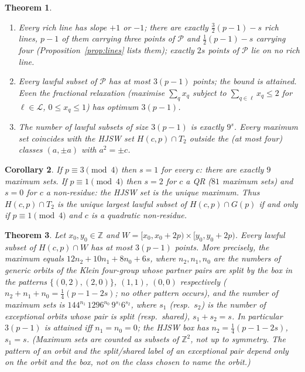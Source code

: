 \documentclass[11pt]{article}
\newtheorem{theorem}{Theorem}
\newtheorem{corollary}[theorem]{Corollary}
\theoremstyle{remark}
\newcommand{\Z}{\mathbb{Z}}
\newcommand{\Hc}{H(c,p)}
\newcommand{\Gp}{G(p)}
\newcommand{\Lc}{\mathcal{L}}
\newcommand{\Pset}{\mathcal{P}}
\begin{document}
\begin{theorem}\label{thm:main}
\begin{enumerate}
\item[(i)] Every rich line has slope $+1$ or $-1$; there are exactly $\tfrac32(p-1)-s$ rich lines, $p-1$ of them
 carrying three points of $\Pset$ and $\tfrac12(p-1)-s$ carrying four (Proposition~\ref{prop:lines} lists them); exactly
 $2s$ points of $\Pset$ lie on no rich line.
\item[(ii)] Every lawful subset of $\Pset$ has at most $3(p-1)$ points; the bound is attained.  Even the fractional
 relaxation (maximise $\sum_q x_q$ subject to $\sum_{q\in\ell}x_q\le2$ for $\ell\in\Lc$, $0\le x_q\le1$) has optimum
 $3(p-1)$.
\item[(iii)] The number of lawful subsets of size $3(p-1)$ is exactly $9^{s}$.  Every maximum set coincides with the
 HJSW set $\Hc\cap T_2$ outside the (at most four) classes $(a,\pm a)$ with $a^2=\pm c$.
\end{enumerate}
\end{theorem}

\begin{corollary}\label{cor:qr}
If $p\equiv3\pmod4$ then $s=1$ for every $c$: there are exactly $9$ maximum sets.  If $p\equiv1\pmod4$ then $s=2$ for
$c$ a QR ($81$ maximum sets) and $s=0$ for $c$ a non-residue: the HJSW set is the unique maximum.  Thus $\Hc\cap T_2$
is the unique largest lawful subset of $\Hc\cap\Gp$ if and only if $p\equiv1\pmod4$ and $c$ is a quadratic non-residue.
\end{corollary}

\begin{theorem}\label{thm:window}
Let $x_0,y_0\in\Z$ and $W=[x_0,x_0+2p)\times[y_0,y_0+2p)$.  Every lawful subset of $\Hc\cap W$ has at most $3(p-1)$
points.  More precisely, the maximum equals $12n_2+10n_1+8n_0+6s$, where $n_2,n_1,n_0$ are the numbers of generic
orbits of the Klein four-group whose partner pairs are split by the box in the patterns $\{(0,2),(2,0)\}$, $(1,1)$, $(0,0)$
respectively ($n_2+n_1+n_0=\tfrac14(p-1-2s)$; no other pattern occurs), and the number of maximum sets is
$144^{n_1}\,1296^{n_0}\,9^{s_1}6^{s_2}$, where $s_1$ (resp.\ $s_2$) is the number of exceptional orbits whose pair is split
(resp.\ shared), $s_1+s_2=s$.  In particular $3(p-1)$ is attained iff $n_1=n_0=0$; the HJSW box has $n_2=\tfrac14(p-1-2s)$,
$s_1=s$.  (Maximum sets are counted as subsets of $\Z^2$, not up to symmetry.  The pattern of an orbit and the split/shared
label of an exceptional pair depend only on the orbit and the box, not on the class chosen to name the orbit.)
\end{theorem}
\end{document}
